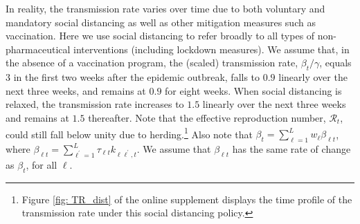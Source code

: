 \documentclass[12pt]{article}
\begin{document}
In reality, the transmission rate varies over time due to both voluntary and
mandatory social distancing as well as other mitigation measures such as
vaccination. Here we use social distancing to refer broadly to all types of
non-pharmaceutical interventions (including lockdown measures). We assume
that, in the absence of a vaccination program, the (scaled) transmission rate,
$\beta_{t}/\gamma$, equals $3$ in the first two weeks after the epidemic
outbreak, falls to $0.9$ linearly over the next three weeks, and remains at
$0.9$ for eight weeks. When social distancing is relaxed, the transmission
rate increases to $1.5$ linearly over the next three weeks and remains at
$1.5$ thereafter. Note that the effective reproduction number, $\mathcal{R}%
_{t}$, could still fall below unity due to herding.\footnote{Figure
\ref{fig: TR_dist} of the online supplement displays the time profile of the
transmission rate under this social distancing policy.} Also note that
$\beta_{t}=\sum_{\ell=1}^{L}w_{\ell}\beta_{\ell t}$, where $\beta_{\ell
t}=\sum_{\ell^{\prime}=1}^{L}\tau_{\ell t}k_{\ell\ell^{\prime},t}$. We assume
that $\beta_{\ell t}$ has the same rate of change as $\beta_{t}$, for all
$\ell$.
\end{document}
